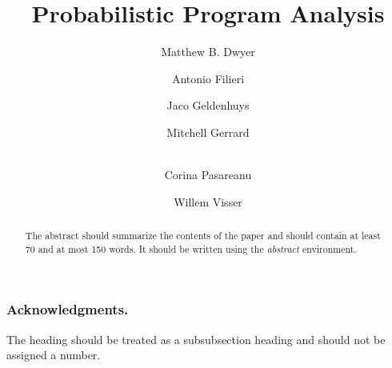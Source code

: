 \documentclass[runningheads,a4paper]{llncs}
\begin{document}
\mainmatter  %

\newcommand{\mycomment}[1]{\textit{\textcolor{red}{#1}}}

\title{Probabilistic Program Analysis}


\author{Matthew B. Dwyer
\and Antonio Filieri\and Jaco Geldenhuys\and Mitchell Gerrard\and\\
Corina Pasareanu\and Willem Visser}
%


%
%

\maketitle


\begin{abstract}
The abstract should summarize the contents of the paper and should
contain at least 70 and at most 150 words. It should be written using the
\emph{abstract} environment.
\keywords{}
\end{abstract}










\subsubsection*{Acknowledgments.} The heading should be treated as a
subsubsection heading and should not be assigned a number.



\end{document}
